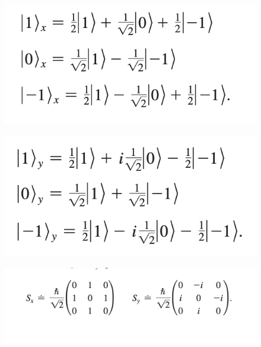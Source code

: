 \documentclass{homework}
\begin{document}
\begin{figure}[htp]
    \centering
    \includegraphics[width=12cm]{Sx}
   

\end{figure}
\begin{figure}[htp]
    \centering
    \includegraphics[width=12cm]{Sy}
   

\end{figure}
\begin{figure}[htp]
    \centering
    \includegraphics[width=12cm]{Sxymatrices}


\end{figure}
\end{document}
